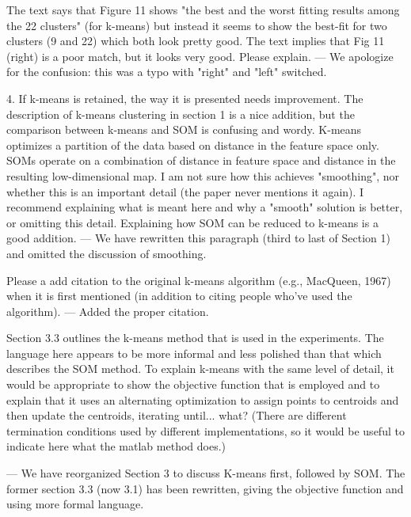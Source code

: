 
The text says that Figure 11 shows "the best and the worst fitting results among the 22 clusters" (for k-means) but instead it seems to show the best-fit for two clusters (9 and 22) which both look pretty good.  The text implies that Fig 11 (right) is a poor match, but it looks very good.  Please explain.
--- We apologize for the confusion: this was a typo with "right" and "left" switched.


4. If k-means is retained, the way it is presented needs improvement. The description of k-means clustering in section 1 is a nice addition, but the comparison between k-means and SOM is confusing and wordy. K-means optimizes a partition of the data based on distance in the feature space only.  SOMs operate on a combination of distance in feature space and distance in the resulting low-dimensional map.  I am not sure how this achieves "smoothing", nor whether this is an important detail (the paper never mentions it again).  I recommend explaining what is meant here and why a "smooth" solution is better, or omitting this detail.  Explaining how SOM can be reduced to k-means is a good addition.
--- We have rewritten this paragraph (third to last of Section 1) and omitted the discussion of smoothing. 

Please a add citation to the original k-means algorithm (e.g., MacQueen, 1967) when it is first mentioned (in addition to citing people who've used the algorithm).
--- Added the proper citation.

Section 3.3 outlines the k-means method that is used in the experiments.  The language here appears to be more informal and less polished than that which describes the SOM method.  To explain k-means with the same level of detail, it would be appropriate to show the objective function that is employed and to explain that it uses an alternating optimization to assign points to centroids and then update the centroids, iterating until... what?  (There are different termination conditions used by different implementations, so it would be useful to indicate here what the matlab method does.)

--- We have reorganized Section 3 to discuss K-means first, followed by SOM. The former section 3.3 (now 3.1) has been rewritten, giving the objective function and using more formal language. 

